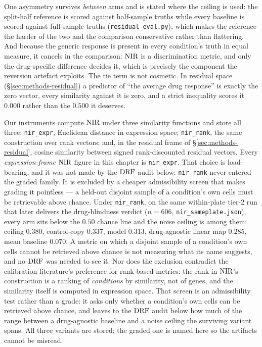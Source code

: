 One asymmetry survives \emph{between} arms and is stated where
the ceiling is used: the split-half reference is scored against half-sample truths while every
baseline is scored against full-sample truths (\texttt{residual\_eval.py}), which makes the
reference the harder of the two and the comparison conservative rather than flattering. And because the generic
response is present in every condition's truth in equal measure, it cancels in the comparison:
$\textrm{NIR}$ is a discrimination metric, and only the drug-specific difference decides it, which is
precisely the component the reversion artefact exploits. The tie term is not cosmetic. In residual
space (\S\ref{sec:methods-residual}) a predictor of ``the average drug response'' is exactly the
zero vector, every similarity against it is zero, and a strict inequality scores it $0.000$ rather
than the $0.500$ it deserves.



Our instruments compute $\textrm{NIR}$ under three similarity functions and store all three:
\texttt{nir\_expr}, Euclidean distance in expression space; \texttt{nir\_rank}, the same
construction over rank vectors; and, in the residual frame of \S\ref{sec:methods-residual}, cosine
similarity between signed rank-discounted residual vectors. Every \emph{expression-frame} $\textrm{NIR}$
figure in this chapter is \texttt{nir\_expr}. That choice is load-bearing, and it was not made by
the $\textrm{DRF}$ audit below: \texttt{nir\_rank} never entered the graded family. It is excluded by a
cheaper admissibility screen that makes grading it pointless --- a held-out disjoint sample of a
condition's own cells must be retrievable above chance. Under \texttt{nir\_rank}, on the same
within-plate tier-2 run that later delivers the drug-blindness verdict ($n = 606$,
\texttt{nir\_sameplate.json}), every arm sits below the $0.50$ chance line and the noise ceiling is
among them: ceiling $0.380$, control-copy $0.337$, model $0.313$, drug-agnostic linear map $0.285$,
mean baseline $0.070$. A metric on which a disjoint sample of a condition's own cells cannot be
retrieved above chance is not measuring what its name suggests, and no $\textrm{DRF}$ was needed to see it.
Nor does the exclusion contradict the calibration literature's preference for rank-based metrics:
the rank in $\textrm{NIR}$'s construction is a ranking of \emph{conditions} by similarity, not of genes, and
the similarity itself is computed in expression space. That screen is an admissibility test rather
than a grade: it asks only whether a condition's own cells can be retrieved above chance, and leaves
to the $\textrm{DRF}$ audit below how much of the range between a drug-agnostic baseline and a noise ceiling
the surviving variant spans. All three variants are stored; the graded one is named here so the artifacts cannot be
misread.

